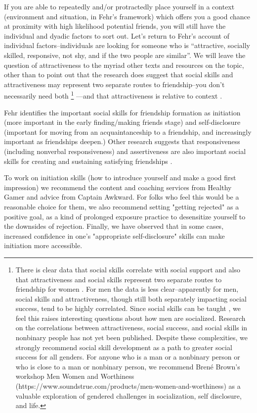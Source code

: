 \documentclass[12pt,letterpaper]{book}
\begin{document}
If you are able to repeatedly and/or protractedly place yourself in a context (environment and situation, in Fehr's framework) which offers you a good chance at proximity with high likelihood potential friends, you will still have the individual and dyadic factors to sort out. Let's return to Fehr's account of individual factors–individuals are looking for someone who is “attractive, socially skilled, responsive, not shy, and if the two people are similar”. We will leave the question of attractiveness to the myriad other texts and resources on the topic, other than to point out that the research does suggest that social skills and attractiveness may represent two separate routes to friendship–you don't necessarily need both \footnote{There is clear data that social skills correlate with social support \cite{sarason1985concomitants} and also that attractiveness and social skills represent two separate routes to friendship for women \cite{reis1982physical}. For men the data is less clear–apparently for men, social skills and attractiveness, though still both separately impacting social success, tend to be highly correlated. Since social skills can be taught \cite{brigman1999teaching,sazak2013outcomes}, we feel this raises interesting questions about how men are socialized. Research on the correlations between attractiveness, social success, and social skills in nonbinary people has not yet been published. Despite these complexities, we strongly recommend social skill development as a path to greater social success for all genders. For anyone who is a man or a nonbinary person or who is close to a man or nonbinary person, we recommend Bren{\'e} Brown's workshop Men Women and Worthiness (https://www.soundstrue.com/products/men-women-and-worthiness) as a valuable exploration of gendered challenges in socialization, self disclosure, and life.} —and that attractiveness is relative to context \cite{geiselman1984context,melamed1975effect,little2011facial,moss1975effects,lei2020contrast}.
 
Fehr identifies the important social skills for friendship formation as initiation (more important in the early finding/making friends stage) and self-disclosure (important for moving from an acquaintanceship to a friendship, and increasingly important as friendships deepen.) Other research suggests that responsiveness (including nonverbal responsiveness) and assertiveness are also important social skills for creating and sustaining satisfying friendships \cite{riggio1986assessment}.

To work on initiation skills (how to introduce yourself and make a good first impression) we recommend the content and coaching services from Healthy Gamer and advice from Captain Awkward. For folks who feel this would be a reasonable choice for them, we also recommend setting "getting rejected" as a positive goal, as a kind of prolonged exposure practice to desensitize yourself to the downsides of rejection. Finally, we have observed that in some cases, increased confidence in one's "appropriate self-disclosure" skills can make initiation more accessible.
\end{document}
